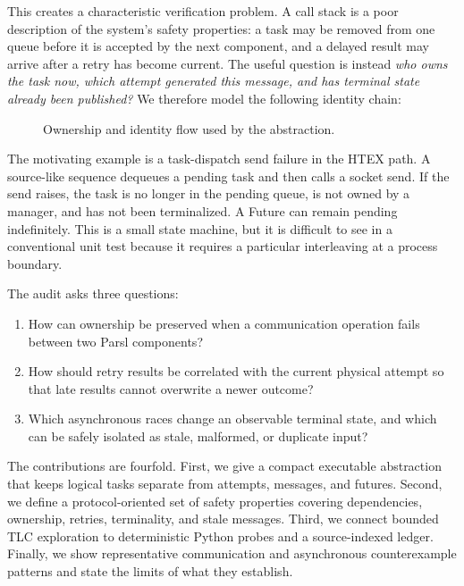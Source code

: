 \documentclass[11pt,a4paper]{article}
\begin{document}
This creates a characteristic verification problem. A call stack is a poor description of the
system's safety properties: a task may be removed from one queue before it is accepted by the next
component, and a delayed result may arrive after a retry has become current. The useful question is
instead \emph{who owns the task now, which attempt generated this message, and has terminal state
already been published?} We therefore model the following identity chain:

\begin{figure}[h]
\centering
{}
\caption{Ownership and identity flow used by the abstraction.}
\label{fig:ownership}
\end{figure}

The motivating example is a task-dispatch send failure in the HTEX path. A source-like sequence
dequeues a pending task and then calls a socket send. If the send raises, the task is no longer in
the pending queue, is not owned by a manager, and has not been terminalized. A Future can remain
pending indefinitely. This is a small state machine, but it is difficult to see in a conventional
unit test because it requires a particular interleaving at a process boundary.

The audit asks three questions:
\begin{enumerate}
  \item How can ownership be preserved when a communication operation fails between two Parsl
        components?
  \item How should retry results be correlated with the current physical attempt so that late
        results cannot overwrite a newer outcome?
  \item Which asynchronous races change an observable terminal state, and which can be safely
        isolated as stale, malformed, or duplicate input?
\end{enumerate}

The contributions are fourfold. First, we give a compact executable abstraction that keeps logical
tasks separate from attempts, messages, and futures. Second, we define a protocol-oriented set of
safety properties covering dependencies, ownership, retries, terminality, and stale messages.
Third, we connect bounded TLC exploration to deterministic Python probes and a source-indexed ledger.
Finally, we show representative communication and asynchronous counterexample patterns and state
the limits of what they establish.
\end{document}
